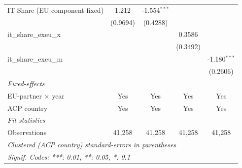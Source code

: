 \begin{tabular}{lcccc}
   IT Share (EU component fixed) & 1.212                                 & -1.554$^{***}$                       &                                                               &   \\   
                                 & (0.9694)                              & (0.4288)                             &                                                               &   \\   
   it\_share\_exeu\_x            &                                       &                                      & 0.3586                                                        &   \\   
                                 &                                       &                                      & (0.3492)                                                      &   \\   
   it\_share\_exeu\_m            &                                       &                                      &                                                               & -1.180$^{***}$\\   
                                 &                                       &                                      &                                                               & (0.2606)\\   
   \midrule
   \emph{Fixed-effects}\\
   EU-partner $\times$ year      & Yes                                   & Yes                                  & Yes                                                           & Yes\\  
   ACP country                   & Yes                                   & Yes                                  & Yes                                                           & Yes\\  
   \midrule
   \emph{Fit statistics}\\
   Observations                  & 41,258                                & 41,258                               & 41,258                                                        & 41,258\\  
   \midrule \midrule
   \multicolumn{5}{l}{\emph{Clustered (ACP country) standard-errors in parentheses}}\\
   \multicolumn{5}{l}{\emph{Signif. Codes: ***: 0.01, **: 0.05, *: 0.1}}\\
\end{tabular}
 
